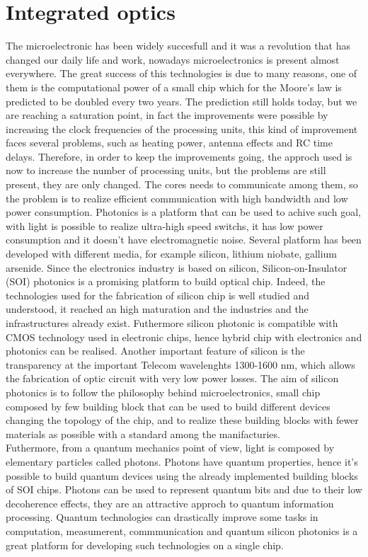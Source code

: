 \section{Integrated optics}
The microelectronic has been widely succesfull and it was a revolution that has changed our daily life and work, nowadays microelectronics is present almost everywhere. The great success of this technologies is due to many reasons, one of them is the computational power of a small chip which for the Moore's law is predicted to be doubled every two years. The prediction still holds today, but we are reaching a saturation point, in fact the improvements were possible by increasing the clock frequencies of the processing units, this kind of improvement faces several problems, such as heating power, antenna effects and RC time delays. Therefore, in order to keep the improvements going, the approch used is now to increase the number of processing units, but the problems are still present, they are only changed. The cores needs to communicate among them, so the problem is to realize efficient communication with high bandwidth and low power consumption. Photonics is a platform that can be used to achive such goal, with light is possible to realize ultra-high speed switchs, it has low power consumption and it doesn't have electromagnetic noise. Several platform has been developed with different media, for example silicon, lithium niobate, gallium arsenide. Since the electronics industry is based on silicon, Silicon-on-Insulator (SOI) photonics is a promising platform to build optical chip. Indeed, the technologies used for the fabrication of silicon chip is well studied and understood, it reached an high maturation and the industries and the infrastructures already exist. Futhermore silicon photonic is compatible with CMOS technology used in electronic chips, hence hybrid chip with electronics and photonics can be realised. Another important feature of silicon is the transparency at the important Telecom wavelenghts 1300-1600 nm, which allows the fabrication of optic circuit with very low power losses. The aim of silicon photonics is to follow the philosophy behind microelectronics, small chip composed by few building block that can be used to build different devices changing the topology of the chip, and to realize these building blocks with fewer materials as possible with a standard among the manifacturies.\\
Futhermore, from a quantum mechanics point of view, light is composed by elementary particles called photons. Photons have quantum properties, hence it's possible to build quantum devices using the already implemented building blocks of SOI chips. Photons can be used to represent quantum bits and due to their low decoherence effects, they are an attractive approch to quantum information processing. Quantum technologies can drastically improve some tasks in computation, measumerent, commmunication and quantum silicon photonics is a great platform for developing such technologies on a single chip. 


